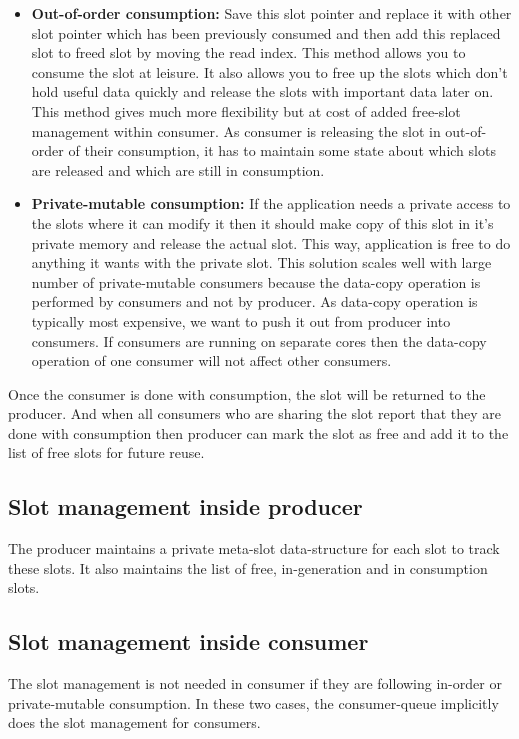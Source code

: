 \documentclass[a4paper,twoside]{report} %
\begin{document}
\begin{enumerate}
\begin{itemize}
    \item \textbf{Out-of-order consumption:} 
    Save this slot pointer and replace it with other slot
    pointer which has been previously consumed and then add this
    replaced slot to freed slot by moving the read index.  This method
    allows you to consume the slot at leisure.  It also allows you to
    free up the slots which don't hold useful data quickly and release
    the slots with important data later on.  This method gives much
    more flexibility but at cost of added free-slot management within
    consumer.  As consumer is releasing the slot in out-of-order of
    their consumption, it has to maintain some state about which slots
    are released and which are still in consumption.

    \item \textbf{Private-mutable consumption:} 
    If the application needs a private access to the slots where it
    can modify it then it should make copy of this slot in it's
    private memory and release the actual slot.  This way, application
    is free to do anything it wants with the private slot.  This
    solution scales well with large number of private-mutable
    consumers because the data-copy operation is performed by
    consumers and not by producer.  As data-copy operation is
    typically most expensive, we want to push it out from producer
    into consumers.  If consumers are running on separate cores then
    the data-copy operation of one consumer will not affect other
    consumers.
  \end{itemize}
  

  Once the consumer is done with consumption, the slot will be
  returned to the producer.  And when all consumers who are sharing
  the slot report that they are done with consumption then producer
  can mark the slot as free and add it to the list of free slots for
  future reuse.
\end{enumerate}

\subsection{Slot management inside producer}
The producer maintains a private meta-slot data-structure for each 
slot to track these slots.  It also maintains the list of free,
in-generation and in consumption slots.

\subsection{Slot management inside consumer}
The slot management is not needed in consumer if they are following
in-order or private-mutable consumption.  In these two cases, the
consumer-queue implicitly does the slot management for consumers.
\end{document}
